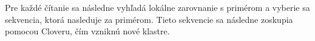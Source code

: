 Pre každé čítanie sa následne vyhľadá lokálne zarovnanie s primérom a vyberie sa sekvencia, ktorá nasleduje za primérom.
Tieto sekvencie sa následne zoskupia pomocou Cloveru, čím vzniknú nové klastre.
